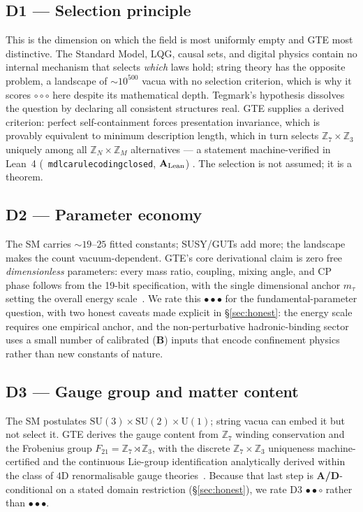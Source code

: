 \documentclass[11pt]{article}
\newcommand{\lean}[1]{%
  \penalty-100
  \begingroup\def\_{\textunderscore\allowbreak}\texttt{#1}\endgroup}
\newcommand{\CatAL}{\ensuremath{\textbf{A}_{\rm Lean}}}
\newcommand{\CatAD}{\textbf{A/D}}
\newcommand{\CatB}{\textbf{B}}
\newcommand{\rFull}{\ensuremath{\bullet\bullet\bullet}}      %
\newcommand{\rStrong}{\ensuremath{\bullet\bullet\circ}}      %
\newcommand{\rNone}{\ensuremath{\circ\circ\circ}}            %
\begin{document}
\FloatBarrier

\subsection*{D1 --- Selection principle}
This is the dimension on which the field is most uniformly empty and GTE most
distinctive.  The Standard Model, LQG, causal sets, and digital physics contain no
internal mechanism that selects \emph{which} laws hold; string theory has the
opposite problem, a landscape of $\sim 10^{500}$ vacua with no selection criterion,
which is why it scores \rNone{} here despite its mathematical depth.  Tegmark's
hypothesis dissolves the question by declaring all consistent structures real.
GTE supplies a derived criterion: perfect self-containment forces presentation
invariance, which is provably equivalent to minimum description length, which in
turn selects $\mathbb{Z}_7\times\mathbb{Z}_3$ uniquely among all
$\mathbb{Z}_N\times\mathbb{Z}_M$ alternatives --- a statement machine-verified in
Lean~4 (\mbox{\lean{mdl\_ca\_rule\_coding\_closed}}, \CatAL)
\cite{SpivackGTEPolynomialWolfram,SpivackNEMS05}.  The selection is not assumed; it
is a theorem.

\subsection*{D2 --- Parameter economy}
The SM carries $\sim 19$--$25$ fitted constants; SUSY/GUTs add more; the landscape
makes the count vacuum-dependent.  GTE's core derivational claim is zero free
\emph{dimensionless} parameters: every mass ratio, coupling, mixing angle, and CP
phase follows from the 19-bit specification, with the single dimensional anchor
$m_\tau$ setting the overall energy scale~\cite{SpivackGTECompleteFramework}.  We
rate this \rFull{} for the fundamental-parameter question, with two honest
caveats made explicit in §\ref{sec:honest}: the energy scale requires one
empirical anchor, and the non-perturbative hadronic-binding sector uses a small
number of calibrated (\CatB) inputs that encode confinement physics rather than
new constants of nature.

\subsection*{D3 --- Gauge group and matter content}
The SM postulates $\mathrm{SU}(3)\times\mathrm{SU}(2)\times\mathrm{U}(1)$; string
vacua can embed it but not select it.  GTE derives the gauge content from
$\mathbb{Z}_7$ winding conservation and the Frobenius group
$F_{21} = \mathbb{Z}_7\rtimes\mathbb{Z}_3$, with the discrete
$\mathbb{Z}_7\times\mathbb{Z}_3$ uniqueness machine-certified and the continuous
Lie-group identification analytically derived within the class of $4$D
renormalisable gauge theories~\cite{SpivackNEMS05}.  Because that last step is
\CatAD-conditional on a stated domain restriction (§\ref{sec:honest}), we rate
D3 \rStrong{} rather than \rFull{}.
\end{document}
